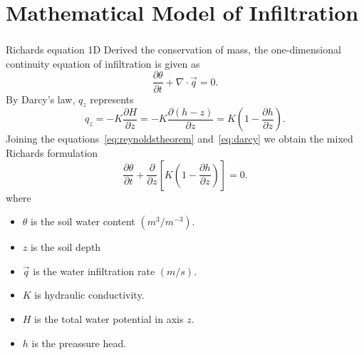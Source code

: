 \section{Mathematical Model of Infiltration}

\begin{frame}
	\frametitle{\secname}

	\begin{block}{Richards equation 1D}
		Derived the conservation of mass,
		the one-dimensional continuity equation of infiltration is given as
		\begin{equation}\label{eq:reynoldstheorem}
			\frac{\partial\theta}{\partial t}+
			\nabla\cdot\vec{q}=0.
		\end{equation}
		By Darcy's law, $q_{z}$ represents
		\begin{equation}\label{eq:darcy}
			q_{z}=
			-K\frac{\partial H}{\partial z}=
			-K\frac{\partial(h-z)}{\partial z}=
			K\left(1-\frac{\partial h}{\partial z}\right).
		\end{equation}
		Joining the equations~\eqref{eq:reynoldstheorem} and~\eqref{eq:darcy}
		we obtain the mixed Richards formulation
		\begin{equation*}
			\frac{\partial\theta}{\partial t}+
			\frac{\partial}{\partial z}
			\left[K\left(1-\frac{\partial h}{\partial z}\right)\right]=0.
		\end{equation*}
		where\vspace*{-0.4cm}
		\begin{multicols}{2}
			\begin{itemize}
				\item $\theta$ is the soil water content $\left(m^3/m^{-3}\right)$.
				\item $z$ is the soil depth
				\item $\vec{q}$ is the water infiltration rate $\left(m/s\right)$.
				\item $K$ is hydraulic conductivity.
				\item $H$ is the total water potential in axis $z$.
				\item $h$ is the preassure head.
			\end{itemize}
		\end{multicols}
	\end{block}

\end{frame}

